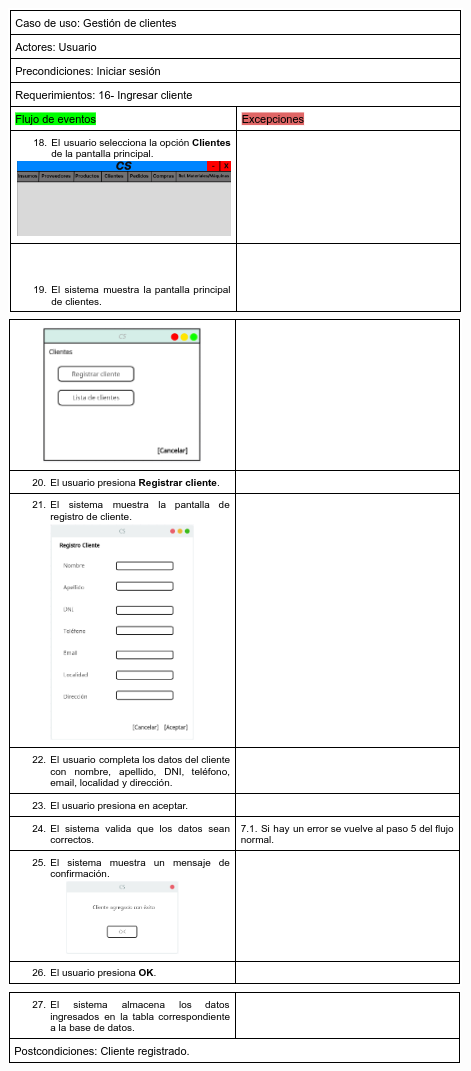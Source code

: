 \documentclass{article}
\begin{document}
	\begin{center}
		\includegraphics[width=1\linewidth]{imagenes/16_especificacion_clientes.png}
		\includegraphics[width=1\linewidth]{imagenes/16_especificacion_clientes2.png}
		\includegraphics[width=1\linewidth]{imagenes/16_especificacion_clientes3.png}
	\end{center}
	
\end{document}
